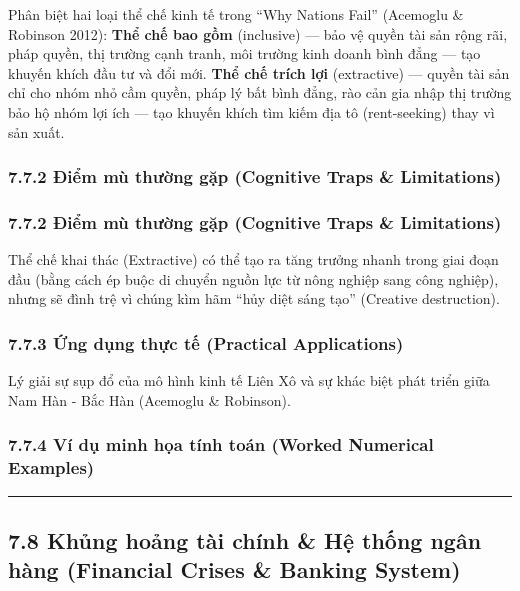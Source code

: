\documentclass[
]{article}
\begin{document}
Phân biệt hai loại thể chế kinh tế trong ``Why Nations Fail'' (Acemoglu
\& Robinson 2012): \textbf{Thể chế bao gồm} (inclusive) --- bảo vệ quyền
tài sản rộng rãi, pháp quyền, thị trường cạnh tranh, môi trường kinh
doanh bình đẳng --- tạo khuyến khích đầu tư và đổi mới. \textbf{Thể chế
trích lợi} (extractive) --- quyền tài sản chỉ cho nhóm nhỏ cầm quyền,
pháp lý bất bình đẳng, rào cản gia nhập thị trường bảo hộ nhóm lợi ích
--- tạo khuyến khích tìm kiếm địa tô (rent-seeking) thay vì sản xuất.

\subsubsection{7.7.2 Điểm mù thường gặp (Cognitive Traps \&
Limitations)}\label{ux111iux1ec3m-muxf9-thux1b0ux1eddng-gux1eb7p-cognitive-traps-limitations-43}

\subsubsection{7.7.2 Điểm mù thường gặp (Cognitive Traps \&
Limitations)}\label{ux111iux1ec3m-muxf9-thux1b0ux1eddng-gux1eb7p-cognitive-traps-limitations-44}

Thể chế khai thác (Extractive) có thể tạo ra tăng trưởng nhanh trong
giai đoạn đầu (bằng cách ép buộc di chuyển nguồn lực từ nông nghiệp sang
công nghiệp), nhưng sẽ đình trệ vì chúng kìm hãm ``hủy diệt sáng tạo''
(Creative destruction).

\subsubsection{7.7.3 Ứng dụng thực tế (Practical
Applications)}\label{ux1ee9ng-dux1ee5ng-thux1ef1c-tux1ebf-practical-applications-23}

Lý giải sự sụp đổ của mô hình kinh tế Liên Xô và sự khác biệt phát triển
giữa Nam Hàn - Bắc Hàn (Acemoglu \& Robinson).

\subsubsection{7.7.4 Ví dụ minh họa tính toán (Worked Numerical
Examples)}\label{vuxed-dux1ee5-minh-hux1ecda-tuxednh-touxe1n-worked-numerical-examples-22}

\begin{center}\rule{0.5\linewidth}{0.5pt}\end{center}

\subsection{7.8 Khủng hoảng tài chính \& Hệ thống ngân hàng (Financial
Crises \& Banking
System)}\label{khux1ee7ng-houx1ea3ng-tuxe0i-chuxednh-hux1ec7-thux1ed1ng-nguxe2n-huxe0ng-financial-crises-banking-system}
\end{document}
